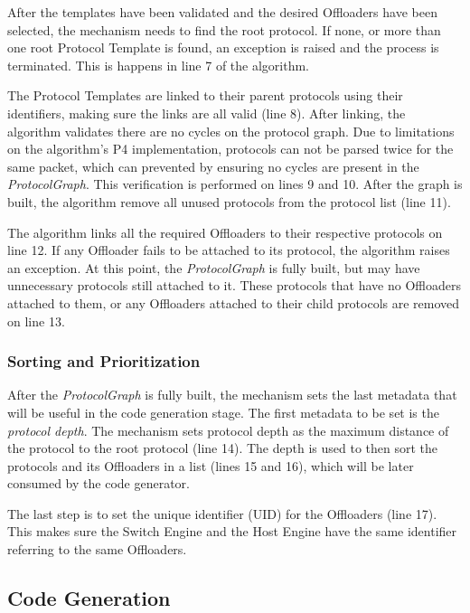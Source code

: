 After the templates have been validated and the desired Offloaders have been selected, the mechanism needs to find the root protocol. If none, or more than one root Protocol Template is found, an exception is raised and the process is terminated. This is happens in line 7 of the algorithm.

The Protocol Templates are linked to their parent protocols using their identifiers, making sure the links are all valid (line 8). After linking, the algorithm validates there are no cycles on the protocol graph. Due to limitations on the algorithm's P4 implementation, protocols can not be parsed twice for the same packet, which can prevented by ensuring no cycles are present in the \textit{ProtocolGraph}. This verification is performed on lines 9 and 10. After the graph is built, the algorithm remove all unused protocols from the protocol list (line 11).

The algorithm links all the required Offloaders to their respective protocols on line 12. If any Offloader fails to be attached to its protocol, the algorithm raises an exception. At this point, the \textit{ProtocolGraph} is fully built, but may have unnecessary protocols still attached to it. These protocols that have no Offloaders attached to them, or any Offloaders attached to their child protocols are removed on line 13.

\subsubsection*{Sorting and Prioritization}

After the \textit{ProtocolGraph} is fully built, the mechanism sets the last metadata that will be useful in the code generation stage. The first metadata to be set is the \textit{protocol depth}. The mechanism sets protocol depth as the maximum distance of the protocol to the root protocol (line 14). The depth is used to then sort the protocols and its Offloaders in a list (lines 15 and 16), which will be later consumed by the code generator.

The last step is to set the unique identifier (UID) for the Offloaders (line 17). This makes sure the Switch Engine and the Host Engine have the same identifier referring to the same Offloaders.

\subsection{Code Generation}

